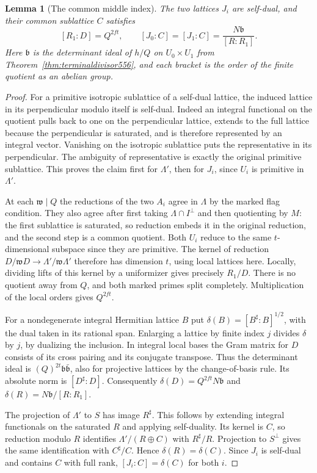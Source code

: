\documentclass[a4paper,11pt]{article}
\newtheorem{lemma}[proposition]{Lemma}
\theoremstyle{definition}
\theoremstyle{remark}
\numberwithin{equation}{section}
\begin{document}
\begin{lemma}[The common middle index]
\leavevmode\label{lem:middleindex570}
The two lattices \(J_i\) are self-dual, and their common
sublattice \(C\) satisfies
\[
        [R_1:D]=Q^{2ft},\qquad
        [J_0:C]=[J_1:C]=\frac{N\mathfrak b}{[R:R_1]} .
\]
Here \(\mathfrak b\) is the determinant ideal of \(h/Q\)
on \(U_0\times U_1\) from
Theorem~\ref{thm:terminaldivisor556}, and each bracket is
the order of the finite quotient as an abelian group.
\end{lemma}
\begin{proof}
For a primitive isotropic sublattice of a self-dual lattice,
the induced lattice in its perpendicular modulo itself is
self-dual. Indeed an integral functional on the quotient
pulls back to one on the perpendicular lattice, extends to
the full lattice because the perpendicular is saturated,
and is therefore represented by an integral vector.
Vanishing on the isotropic sublattice puts the representative
in its perpendicular. The ambiguity of representative is
exactly the original primitive sublattice. This proves the
claim first for \(\Lambda'\), then for \(J_i\), since \(U_i\)
is primitive in \(\Lambda'\).

At each \(\mathfrak w\mid Q\) the reductions of the two
\(A_i\) agree in \(\Lambda\) by the marked flag condition.
They also agree after first taking \(\Lambda\cap I^\perp\)
and then quotienting by \(M\): the first sublattice is
saturated, so reduction embeds it in the original
reduction, and the second step is a common quotient.
Both \(U_i\) reduce to the same \(t\)-dimensional subspace
since they are primitive. The kernel of reduction
\(D/\mathfrak wD\to\Lambda'/\mathfrak w\Lambda'\)
therefore has dimension \(t\), using local lattices here.
Locally, dividing lifts of this kernel by a uniformizer
gives precisely \(R_1/D\). There is no quotient away
from \(Q\), and both marked primes split completely.
Multiplication of the local orders gives \(Q^{2ft}\).

For a nondegenerate integral Hermitian lattice \(B\) put
\(\delta(B)=[B^\sharp:B]^{1/2}\), with the dual taken in
its rational span. Enlarging a lattice by finite index \(j\)
divides \(\delta\) by \(j\), by dualizing the inclusion.
In integral local bases the Gram matrix for \(D\) consists
of its cross pairing and its conjugate transpose. Thus the
determinant ideal is \((Q)^{2t}\mathfrak b\bar{\mathfrak b}\),
also for projective lattices by the change-of-basis rule.
Its absolute norm is \([D^\sharp:D]\). Consequently
\(\delta(D)=Q^{2ft}N\mathfrak b\) and
\(\delta(R)=N\mathfrak b/[R:R_1]\).

The projection of \(\Lambda'\) to \(S\) has image \(R^\sharp\).
This follows by extending integral functionals on the
saturated \(R\) and applying self-duality. Its kernel is
\(C\), so reduction modulo \(R\) identifies
\(\Lambda'/(R\oplus C)\) with \(R^\sharp/R\).
Projection to \(S^\perp\) gives the same identification
with \(C^\sharp/C\). Hence \(\delta(R)=\delta(C)\).
Since \(J_i\) is self-dual and contains \(C\) with full
rank, \([J_i:C]=\delta(C)\) for both \(i\).
\end{proof}
\end{document}
